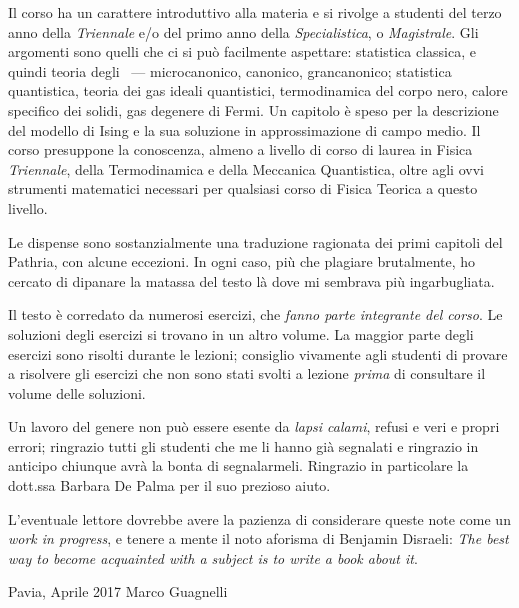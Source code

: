 Il corso ha un carattere introduttivo alla materia e si rivolge a studenti del terzo anno della {\em Triennale} e/o del primo anno della {\em Specialistica}, o {\em Magistrale}. Gli argomenti sono quelli che ci si può facilmente aspettare: statistica classica, e quindi teoria degli \ensembles\ --- microcanonico, canonico, grancanonico; statistica quantistica, teoria dei gas ideali quantistici, termodinamica del corpo nero, calore specifico dei solidi, gas degenere di Fermi. Un capitolo è speso per la descrizione del modello di Ising e la sua soluzione in approssimazione di campo medio. Il corso presuppone la conoscenza, almeno a livello di corso di laurea in Fisica {\em Triennale}, della Termodinamica e della Meccanica Quantistica, oltre agli ovvi strumenti matematici necessari per qualsiasi corso di Fisica Teorica a questo livello.

Le dispense sono sostanzialmente una traduzione ragionata dei primi capitoli del Pathria, con alcune eccezioni. In ogni caso, più che plagiare brutalmente, ho cercato di dipanare la matassa del testo là dove mi sembrava più ingarbugliata.

Il testo è corredato da numerosi esercizi, che {\em fanno parte integrante del corso}. Le soluzioni degli esercizi si trovano in un altro volume. La maggior parte degli esercizi sono risolti durante le lezioni; consiglio vivamente agli studenti di provare a risolvere gli esercizi che non sono stati svolti a lezione {\em prima} di consultare il volume delle soluzioni.

Un lavoro del genere non può essere esente da {\em lapsi calami}, refusi e veri e propri errori; ringrazio tutti gli studenti che me li hanno già segnalati e ringrazio in anticipo chiunque avrà la bonta di segnalarmeli. Ringrazio in particolare la dott.ssa Barbara De Palma per il suo prezioso aiuto.
 
L'eventuale lettore dovrebbe avere la pazienza di considerare queste note come un {\em work in progress}, e tenere a mente il noto aforisma di Benjamin Disraeli: {\em The best way to become acquainted with a subject is to write a book about it}.

\vskip 1cm
\noindent
Pavia, Aprile 2017 \hfill Marco Guagnelli



